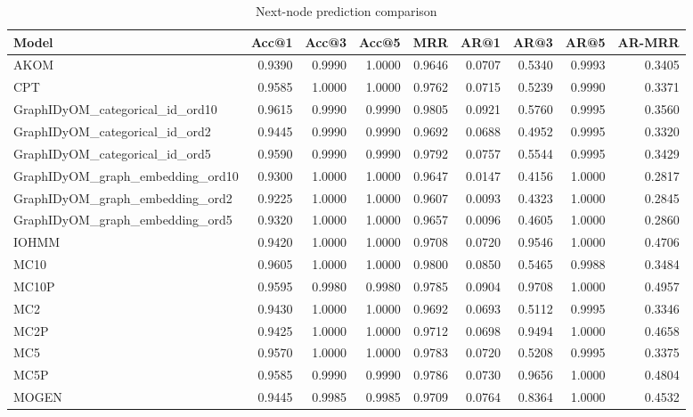 \begin{table}
\caption{Next-node prediction comparison}
\label{tab:comparison}
\begin{tabular}{lrrrrrrrr}
\toprule
Model & Acc@1 & Acc@3 & Acc@5 & MRR & AR@1 & AR@3 & AR@5 & AR-MRR \\
\midrule
AKOM & 0.9390 & 0.9990 & 1.0000 & 0.9646 & 0.0707 & 0.5340 & 0.9993 & 0.3405 \\
CPT & 0.9585 & 1.0000 & 1.0000 & 0.9762 & 0.0715 & 0.5239 & 0.9990 & 0.3371 \\
GraphIDyOM_categorical_id_ord10 & 0.9615 & 0.9990 & 0.9990 & 0.9805 & 0.0921 & 0.5760 & 0.9995 & 0.3560 \\
GraphIDyOM_categorical_id_ord2 & 0.9445 & 0.9990 & 0.9990 & 0.9692 & 0.0688 & 0.4952 & 0.9995 & 0.3320 \\
GraphIDyOM_categorical_id_ord5 & 0.9590 & 0.9990 & 0.9990 & 0.9792 & 0.0757 & 0.5544 & 0.9995 & 0.3429 \\
GraphIDyOM_graph_embedding_ord10 & 0.9300 & 1.0000 & 1.0000 & 0.9647 & 0.0147 & 0.4156 & 1.0000 & 0.2817 \\
GraphIDyOM_graph_embedding_ord2 & 0.9225 & 1.0000 & 1.0000 & 0.9607 & 0.0093 & 0.4323 & 1.0000 & 0.2845 \\
GraphIDyOM_graph_embedding_ord5 & 0.9320 & 1.0000 & 1.0000 & 0.9657 & 0.0096 & 0.4605 & 1.0000 & 0.2860 \\
IOHMM & 0.9420 & 1.0000 & 1.0000 & 0.9708 & 0.0720 & 0.9546 & 1.0000 & 0.4706 \\
MC10 & 0.9605 & 1.0000 & 1.0000 & 0.9800 & 0.0850 & 0.5465 & 0.9988 & 0.3484 \\
MC10P & 0.9595 & 0.9980 & 0.9980 & 0.9785 & 0.0904 & 0.9708 & 1.0000 & 0.4957 \\
MC2 & 0.9430 & 1.0000 & 1.0000 & 0.9692 & 0.0693 & 0.5112 & 0.9995 & 0.3346 \\
MC2P & 0.9425 & 1.0000 & 1.0000 & 0.9712 & 0.0698 & 0.9494 & 1.0000 & 0.4658 \\
MC5 & 0.9570 & 1.0000 & 1.0000 & 0.9783 & 0.0720 & 0.5208 & 0.9995 & 0.3375 \\
MC5P & 0.9585 & 0.9990 & 0.9990 & 0.9786 & 0.0730 & 0.9656 & 1.0000 & 0.4804 \\
MOGEN & 0.9445 & 0.9985 & 0.9985 & 0.9709 & 0.0764 & 0.8364 & 1.0000 & 0.4532 \\
\bottomrule
\end{tabular}
\end{table}
